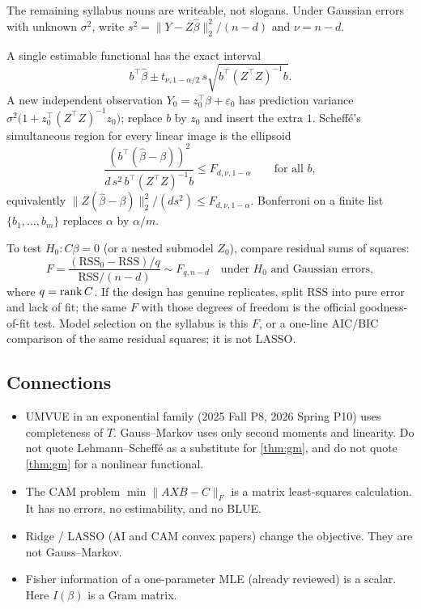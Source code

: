 The remaining syllabus nouns are writeable, not slogans. Under Gaussian errors with unknown \(\sigma^{2}\), write \(s^{2}=\|Y-Z\hat\beta\|_{2}^{2}/(n-d)\) and \(\nu=n-d\).

\begin{definition}
\label{def:lm-inf}
A single estimable functional has the exact interval
\[
b^{\top}\hat\beta
\pm
t_{\nu,1-\alpha/2}\,
s\sqrt{b^{\top}(Z^{\top}Z)^{-1}b}.
\]
A new independent observation \(Y_{0}=z_{0}^{\top}\beta+\varepsilon_{0}\) has prediction variance \(\sigma^{2}\bigl(1+z_{0}^{\top}(Z^{\top}Z)^{-1}z_{0}\bigr)\); replace \(b\) by \(z_{0}\) and insert the extra \(1\). Scheff\'e's simultaneous region for every linear image is the ellipsoid
\[
\frac{(b^{\top}(\hat\beta-\beta))^{2}}{d\,s^{2}\,b^{\top}(Z^{\top}Z)^{-1}b}
\le
F_{d,\nu,1-\alpha}
\qquad\text{for all }b,
\]
equivalently \(\|Z(\hat\beta-\beta)\|_{2}^{2}/(d s^{2})\le F_{d,\nu,1-\alpha}\). Bonferroni on a finite list \(\{b_{1},\ldots,b_{m}\}\) replaces \(\alpha\) by \(\alpha/m\).
\end{definition}

\begin{definition}
\label{def:ess}
To test \(H_{0}:C\beta=0\) (or a nested submodel \(Z_{0}\)), compare residual sums of squares:
\[
F
=
\frac{(\mathrm{RSS}_{0}-\mathrm{RSS})/q}{\mathrm{RSS}/(n-d)}
\sim
F_{q,n-d}
\quad\text{under \(H_{0}\) and Gaussian errors},
\]
where \(q=\operatorname{rank} C\). If the design has genuine replicates, split \(\mathrm{RSS}\) into pure error and lack of fit; the same \(F\) with those degrees of freedom is the official goodness-of-fit test. Model selection on the syllabus is this \(F\), or a one-line AIC/BIC comparison of the same residual squares; it is not LASSO.
\end{definition}

\subsection{Connections}

\begin{itemize}
    \item UMVUE in an exponential family (2025 Fall P8, 2026 Spring P10) uses completeness of \(T\). Gauss--Markov uses only second moments and linearity. Do not quote Lehmann--Scheffé as a substitute for \cref{thm:gm}, and do not quote \cref{thm:gm} for a nonlinear functional.
    \item The CAM problem \(\min\|AXB-C\|_{F}\) is a matrix least-squares calculation. It has no errors, no estimability, and no BLUE.
    \item Ridge / LASSO (AI and CAM convex papers) change the objective. They are not Gauss--Markov.
    \item Fisher information of a one-parameter MLE (already reviewed) is a scalar. Here \(I(\beta)\) is a Gram matrix.
\end{itemize}

